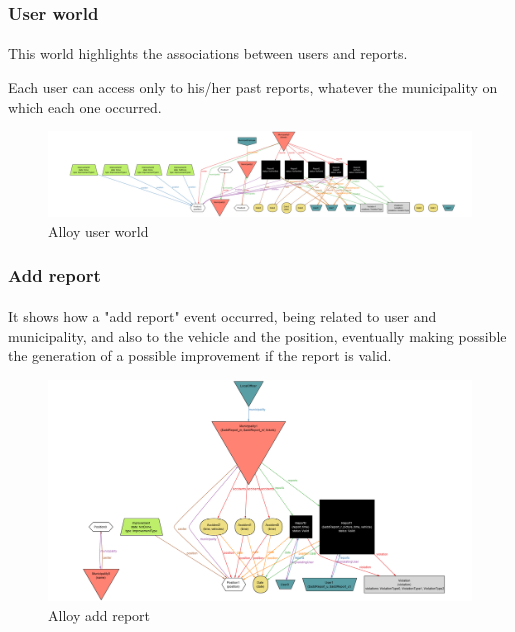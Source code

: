 			\subsubsection{User world}
				\paragraph{}
					This world highlights the associations between users and reports.
					
					Each user can access only to his/her past reports, whatever the municipality on which each one occurred.
					\begin{figure}[!h]
						\includegraphics[width=\textwidth]{images/Alloy/UserWorld.png}
						\caption{Alloy user world}
					\end{figure}
			\subsubsection{Add report}
				\paragraph{}
					It shows how a "add report" event occurred, being related to user and municipality, and also to the vehicle and the position, eventually making possible the generation of a possible improvement if the report is valid.
					\begin{figure}[!h]
						\includegraphics[width=\textwidth]{images/Alloy/AddReport.png}
						\caption{Alloy add report}
					\end{figure}
	